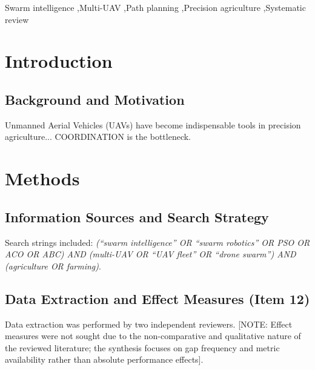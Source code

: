 \documentclass[review,3p,times]{elsarticle}
\begin{document}
\begin{frontmatter}
\begin{abstract}
\textbf{Methods:} Following PRISMA 2020 guidelines, 33 studies (26 primary research articles, 7 review articles) met all inclusion criteria. A secondary rescreening of 44 originally excluded records was conducted to ensure maximum recall, confirming the final N=33 corpus.

\textbf{Results:} Particle Swarm Optimisation dominates (10 of 33 studies, 30.3\%), followed by Ant Colony Optimisation (3 of 33, 9.1\%). All 26 primary studies (100\%) lack real-world field validation; 25 of 33 (75.8\%) omit dynamic environmental modelling. Metric reporting is sparse: only 14 of 33 (42.4\%) report execution time.

\textbf{Conclusions:} SI-based multi-UAV path planning in agriculture is algorithmically mature but deployment-constrained. This study provides the first structured gap analysis for this domain and proposes the AgriSwarm-Bench framework to accelerate the simulation-to-field transition.
\end{abstract}

\begin{keyword}
Swarm intelligence \sep Multi-UAV \sep Path planning \sep Precision agriculture \sep Systematic review
\end{keyword}

\end{frontmatter}

\section{Introduction}
\subsection{Background and Motivation}
Unmanned Aerial Vehicles (UAVs) have become indispensable tools in precision agriculture... COORDINATION is the bottleneck.

\section{Methods}
\subsection{Information Sources and Search Strategy}
Search strings included: \textit{(``swarm intelligence'' OR ``swarm robotics'' OR PSO OR ACO OR ABC) AND (multi-UAV OR ``UAV fleet'' OR ``drone swarm'') AND (agriculture OR farming)}.

\subsection{Data Extraction and Effect Measures (Item 12)}
\label{sec:data_extraction}
Data extraction was performed by two independent reviewers. [NOTE: Effect measures were not sought due to the non-comparative and qualitative nature of the reviewed literature; the synthesis focuses on gap frequency and metric availability rather than absolute performance effects].
\end{document}
